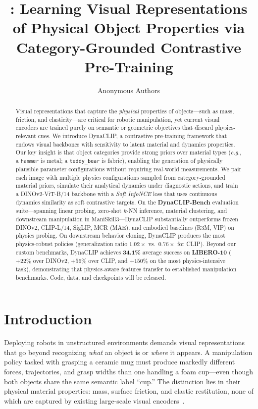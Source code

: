 \documentclass{article}
\title{\methodname{}: Learning Visual Representations of Physical Object Properties via Category-Grounded Contrastive Pre-Training}
\author{Anonymous Authors}
\date{}
\newcommand{\methodname}{DynaCLIP}
\newcommand{\eg}{\textit{e.g.}}
\begin{document}
\maketitle

\begin{abstract}
Visual representations that capture the \emph{physical} properties of objects---such as mass, friction, and elasticity---are critical for robotic manipulation, yet current visual encoders are trained purely on semantic or geometric objectives that discard physics-relevant cues. We introduce \methodname{}, a contrastive pre-training framework that endows visual backbones with sensitivity to latent material and dynamics properties. Our key insight is that object categories provide strong priors over material types (\eg, a \texttt{hammer} is metal; a \texttt{teddy\_bear} is fabric), enabling the generation of physically plausible parameter configurations without requiring real-world measurements. We pair each image with multiple physics configurations sampled from category-grounded material priors, simulate their analytical dynamics under diagnostic actions, and train a DINOv2-ViT-B/14 backbone with a \emph{Soft InfoNCE} loss that uses continuous dynamics similarity as soft contrastive targets. On the \textbf{DynaCLIP-Bench} evaluation suite---spanning linear probing, zero-shot $k$-NN inference, material clustering, and downstream manipulation in ManiSkill3---\methodname{} substantially outperforms frozen DINOv2, CLIP-L/14, SigLIP, MCR (MAE), and embodied baselines (R3M, VIP) on physics probing. On downstream behavior cloning, \methodname{} produces the most physics-robust policies (generalization ratio $1.02\times$ vs.\ $0.76\times$ for CLIP). Beyond our custom benchmarks, \methodname{} achieves \textbf{34.1\%} average success on \textbf{LIBERO-10} ($+22\%$ over DINOv2, $+56\%$ over CLIP, and $+150\%$ on the most physics-intensive task), demonstrating that physics-aware features transfer to established manipulation benchmarks. Code, data, and checkpoints will be released.
\end{abstract}


\section{Introduction}
\label{sec:intro}

Deploying robots in unstructured environments demands visual representations that go beyond recognizing \emph{what} an object is or \emph{where} it appears. A manipulation policy tasked with grasping a ceramic mug must produce markedly different forces, trajectories, and grasp widths than one handling a foam cup---even though both objects share the same semantic label ``cup.'' The distinction lies in their physical material properties: mass, surface friction, and elastic restitution, none of which are captured by existing large-scale visual encoders~\cite{oquab2024dinov2,radford2021clip,zhai2023siglip}.
\end{document}
